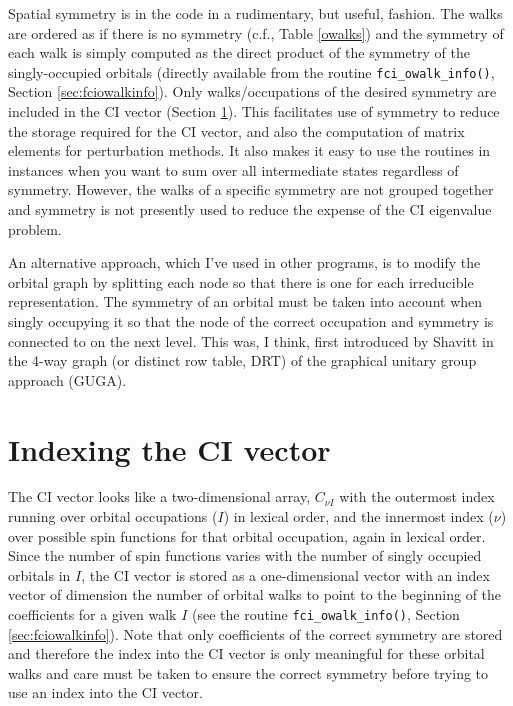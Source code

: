 Spatial symmetry is in the code in a rudimentary, but useful, fashion.
The walks are ordered as if there is no symmetry (c.f., Table
\ref{owalks}) and the symmetry of each walk is simply computed as the
direct product of the symmetry of the singly-occupied orbitals
(directly available from the routine \verb+fci_owalk_info()+, Section
\ref{sec:fciowalkinfo}).  Only walks/occupations of the desired
symmetry are included in the CI vector (Section \ref{sec:ciindex}).
This facilitates use of symmetry to reduce the storage required for
the CI vector, and also the computation of matrix elements for
perturbation methods.  It also makes it easy to use the routines in
instances when you want to sum over all intermediate states regardless
of symmetry.  However, the walks of a specific symmetry are not
grouped together and symmetry is not presently used to reduce the
expense of the CI eigenvalue problem.

An alternative approach, which I've used in other programs,
is to modify the orbital graph by splitting each node so
that there is one for each irreducible representation.  The symmetry
of an orbital must be taken into account when singly occupying it so
that the node of the correct occupation and symmetry is connected to
on the next level.  This was, I think, first introduced by Shavitt
\cite{shavittguga,shavittguga2} in the 4-way graph (or distinct row
table, DRT) of the graphical unitary group approach (GUGA).

\section{Indexing the CI vector}
\label{sec:ciindex}

The CI vector looks like a two-dimensional array, $C_{\nu I}$ with the
outermost index running over orbital occupations ($I$) in lexical
order, and the innermost index ($\nu$) over possible spin functions
for that orbital occupation, again in lexical order.  Since the number
of spin functions varies with the number of singly occupied orbitals
in $I$, the CI vector is stored as a one-dimensional vector with an
index vector of dimension the number of orbital walks to point to the
beginning of the coefficients for a given walk $I$ (see the routine
\verb+fci_owalk_info()+, Section \ref{sec:fciowalkinfo}).  Note that
only coefficients of the correct symmetry are stored and therefore the
index into the CI vector is only meaningful for these orbital walks
and care must be taken to ensure the correct symmetry before trying to
use an index into the CI vector.

